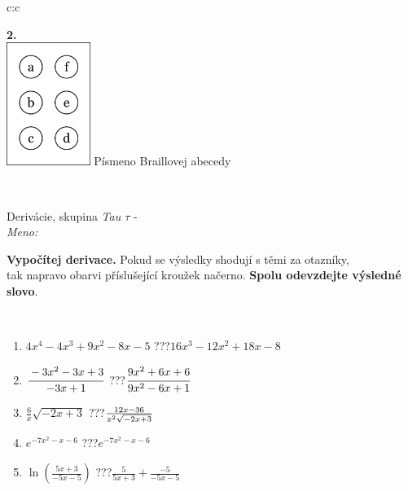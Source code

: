 \documentclass[10pt]{report}
\begin{document}
\begin{tabular}{c:c}
\begin{minipage}[c][104.5mm][t]{0.5\linewidth}
\begin{center}
\begin{minipage}{0.20\linewidth}
\begin{center}
{\Huge\bfseries 2.} \\[2mm]
\includegraphics[height=40mm]{../images/braille.png}
{\small Písmeno Braillovej abecedy}
\end{center}
\end{minipage}
\end{center}
\end{minipage}
\\ \hdashline
\begin{minipage}[c][104.5mm][t]{0.5\linewidth}
\begin{center}
\vspace{7mm}
{\huge Derivácie, skupina \textit{Tau $\tau$} -}\\[5mm]
\textit{Meno:}\phantom{xxxxxxxxxxxxxxxxxxxxxxxxxxxxxxxxxxxxxxxxxxxxxxxxxxxxxxxxxxxxxxxxx}\\[5mm]
\begin{minipage}{0.95\linewidth}
\begin{center}
\textbf{Vypočítej derivace.} Pokud se výsledky shodují s těmi za otazníky,\\tak napravo obarvi příslušející kroužek načerno. \textbf{Spolu odevzdejte výsledné slovo}.
\end{center}
\end{minipage}
\\[1mm]
\begin{minipage}{0.79\linewidth}
\begin{center}
\begin{varwidth}{\linewidth}
\begin{enumerate}
\normalsize
\item $4x^4-4x^3+9x^2-8x-5$\quad \dotfill\; ???\;\dotfill \quad $16x^3-12x^2+18x-8$
\item $\cfrac{-3x^2-3x+3}{-3x+1}$\quad \dotfill\; ???\;\dotfill \quad $\cfrac{9x^2+6x+6}{9x^2-6x+1}$
\item $\frac{6}{x}\sqrt{-2x+3}$\quad \dotfill\; ???\;\dotfill \quad $\frac{12x-36}{x^2 \sqrt{\smash[b]{-2x+3}}}$
\item $e^{-7x^2-x-6}$\quad \dotfill\; ???\;\dotfill \quad $e^{-7x^2-x-6}$
\item $\ln{\left(\frac{5x+3}{-5x-5}\right)}$\quad \dotfill\; ???\;\dotfill \quad $\frac{5}{5x+3}+\frac{-5}{-5x-5}$

\end{enumerate}
\end{varwidth}
\end{center}
\end{minipage}
\end{center}
\end{minipage}
\end{tabular}
\end{document}
